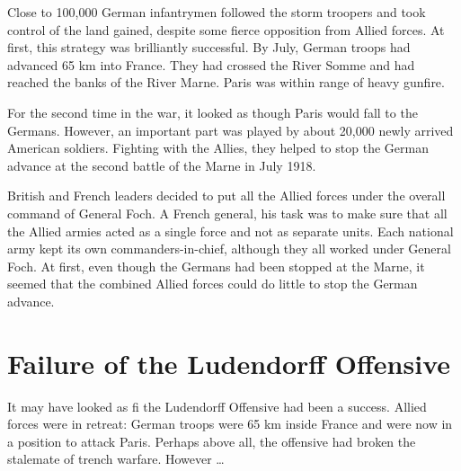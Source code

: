 \documentclass[a4paper,numbers=endperiod,most,twoside,english,final,openany]{scrbook} %
\begin{document}
Close to 100,000 German infantrymen followed the storm troopers and took control of the land gained, despite some fierce opposition from Allied forces. At first, this strategy was brilliantly successful. By July, German troops had advanced 65 km into France. They had crossed the River Somme and had reached the banks of the River Marne. Paris was within range of heavy gunfire.

For the second time in the war, it looked as though Paris would fall to the Germans. However, an important part was played by about 20,000 newly
arrived American soldiers. Fighting with the Allies, they helped to stop the German advance at the second battle of the Marne in July 1918.

British and French leaders decided to put all the Allied forces under the overall command of General Foch. A French general, his task was to make sure that all the Allied armies acted as a single force and not as separate units. Each national army kept its own commanders-in-chief, although they all worked under General Foch. At first, even though the Germans had been stopped at the Marne, it seemed that the combined Allied forces could do little to stop the German advance.



\section{Failure of the Ludendorff Offensive}

It may have looked as fi the Ludendorff Offensive had been a success. Allied forces were in retreat: German troops were 65 km inside France and were now in a position to attack Paris. Perhaps above all, the offensive had broken the stalemate of trench warfare. However \ldots
\end{document}
